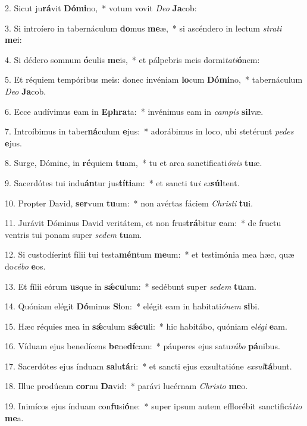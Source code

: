 2. Sicut ju\textbf{rá}vit \textbf{Dó}\textbf{mi}no,~*  votum vovit \textit{De}\textit{o} \textbf{Ja}cob:\

3. Si introíero in tabernáculum \textbf{do}mus \textbf{me}æ,~*  si ascéndero in lectum \textit{stra}\textit{ti} \textbf{me}i:\

4. Si dédero somnum \textbf{ó}culis \textbf{me}is,~*  et pálpebris meis dormi\textit{ta}\textit{ti}\textbf{ó}nem:\

5. Et réquiem tempóribus meis: donec invéniam \textbf{lo}cum \textbf{Dó}\textbf{mi}no,~*  tabernáculum \textit{De}\textit{o} \textbf{Ja}cob.\

6. Ecce audívimus \textbf{e}am in \textbf{E}\textbf{phra}ta:~*  invénimus eam in \textit{cam}\textit{pis} \textbf{sil}væ.\

7. Introíbimus in taber\textbf{ná}culum \textbf{e}jus:~*  adorábimus in loco, ubi stetérunt \textit{pe}\textit{des} \textbf{e}jus.\

8. Surge, Dómine, in \textbf{ré}quiem \textbf{tu}am,~*  tu et arca sanctificati\textit{ó}\textit{nis} \textbf{tu}æ.\

9. Sacerdótes tui indu\textbf{án}tur jus\textbf{tí}\textbf{ti}am:~*  et sancti tu\textit{i} \textit{ex}\textbf{súl}tent.\

10. Propter David, \textbf{ser}vum \textbf{tu}um:~*  non avértas fáciem \textit{Chris}\textit{ti} \textbf{tu}i.\

11. Jurávit Dóminus David veritátem, et non frus\textbf{trá}bitur \textbf{e}am:~*  de fructu ventris tui ponam super \textit{se}\textit{dem} \textbf{tu}am.\

12. Si custodíerint fílii tui testa\textbf{mén}tum \textbf{me}um:~*  et testimónia mea hæc, quæ do\textit{cé}\textit{bo} \textbf{e}os.\

13. Et fílii eórum \textbf{us}que in \textbf{sǽ}\textbf{cu}lum:~*  sedébunt super \textit{se}\textit{dem} \textbf{tu}am.\

14. Quóniam elégit \textbf{Dó}minus \textbf{Si}on:~*  elégit eam in habitati\textit{ó}\textit{nem} \textbf{si}bi.\

15. Hæc réquies mea in \textbf{sǽ}culum \textbf{sǽ}\textbf{cu}li:~*  hic habitábo, quóniam e\textit{lé}\textit{gi} \textbf{e}am.\

16. Víduam ejus benedícens \textbf{be}ne\textbf{dí}cam:~*  páuperes ejus satu\textit{rá}\textit{bo} \textbf{pá}nibus.\

17. Sacerdótes ejus índuam \textbf{sa}lu\textbf{tá}ri:~*  et sancti ejus exsultatióne \textit{ex}\textit{sul}\textbf{tá}bunt.\

18. Illuc prodúcam \textbf{cor}nu \textbf{Da}vid:~*  parávi lucérnam \textit{Chris}\textit{to} \textbf{me}o.\

19. Inimícos ejus índuam con\textbf{fu}si\textbf{ó}ne:~*  super ipsum autem efflorébit sanctificá\textit{ti}\textit{o} \textbf{me}a.\

